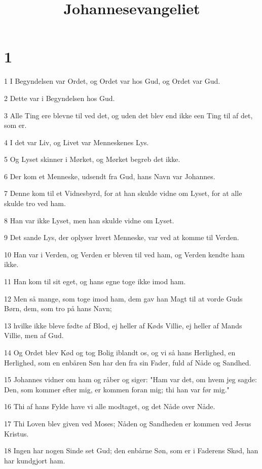 

\title{Johannesevangeliet}


\chapter{1}

\par 1 I Begyndelsen var Ordet, og Ordet var hos Gud, og Ordet var Gud.
\par 2 Dette var i Begyndelsen hos Gud.
\par 3 Alle Ting ere blevne til ved det, og uden det blev end ikke een Ting til af det, som er.
\par 4 I det var Liv, og Livet var Menneskenes Lys.
\par 5 Og Lyset skinner i Mørket, og Mørket begreb det ikke.
\par 6 Der kom et Menneske, udsendt fra Gud, hans Navn var Johannes.
\par 7 Denne kom til et Vidnesbyrd, for at han skulde vidne om Lyset, for at alle skulde tro ved ham.
\par 8 Han var ikke Lyset, men han skulde vidne om Lyset.
\par 9 Det sande Lys, der oplyser hvert Menneske, var ved at komme til Verden.
\par 10 Han var i Verden, og Verden er bleven til ved ham, og Verden kendte ham ikke.
\par 11 Han kom til sit eget, og hans egne toge ikke imod ham.
\par 12 Men så mange, som toge imod ham, dem gav han Magt til at vorde Guds Børn, dem, som tro på hans Navn;
\par 13 hvilke ikke bleve fødte af Blod, ej heller af Køds Villie, ej heller af Mands Villie, men af Gud.
\par 14 Og Ordet blev Kød og tog Bolig iblandt os, og vi så hans Herlighed, en Herlighed, som en enbåren Søn har den fra sin Fader, fuld af Nåde og Sandhed.
\par 15 Johannes vidner om ham og råber og siger: "Ham var det, om hvem jeg sagde: Den, som kommer efter mig, er kommen foran mig; thi han var før mig."
\par 16 Thi af hans Fylde have vi alle modtaget, og det Nåde over Nåde.
\par 17 Thi Loven blev given ved Moses; Nåden og Sandheden er kommen ved Jesus Kristus.
\par 18 Ingen har nogen Sinde set Gud; den enbårne Søn, som er i Faderens Skød, han har kundgjort ham.
